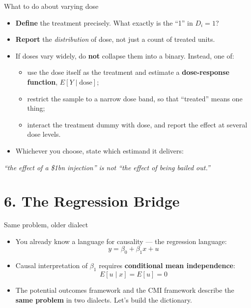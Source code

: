 \documentclass[
  11pt,
  ignorenonframetext,
  aspectratio=169,
]{beamer}
\providecommand{\tightlist}{%
  \setlength{\itemsep}{0pt}\setlength{\parskip}{0pt}}
\begin{document}
\begin{frame}{What to do about varying dose}
\protect{}\label{what-to-do-about-varying-dose}
\begin{itemize}
\tightlist
\item
  \textbf{Define} the treatment precisely. What exactly is the ``1'' in
  \(D_i = 1\)?
\item
  \textbf{Report} the \emph{distribution} of dose, not just a count of
  treated units.
\item
  If doses vary widely, do \textbf{not} collapse them into a binary.
  Instead, one of:

  \begin{itemize}
  \tightlist
  \item
    use the dose itself as the treatment and estimate a
    \textbf{dose-response function}, \(E[Y \mid \text{dose}]\);
  \item
    restrict the sample to a narrow dose band, so that ``treated'' means
    one thing;
  \item
    interact the treatment dummy with dose, and report the effect at
    several dose levels.
  \end{itemize}
\item
  Whichever you choose, state which estimand it delivers:
\end{itemize}

\begin{center}
\emph{``the effect of a \$1bn injection'' is not ``the effect of being bailed out.''}
\end{center}
\end{frame}

\section{6. The Regression Bridge}\label{the-regression-bridge}

\begin{frame}{Same problem, older dialect}
\protect{}\label{same-problem-older-dialect}
\begin{itemize}
\tightlist
\item
  You already know a language for causality --- the regression language:
  \[
  y = \beta_0 + \beta_1 x + u
  \]
\item
  Causal interpretation of \(\beta_1\) requires \textbf{conditional mean
  independence}: \[
  E[u \mid x] = E[u] = 0
  \]
\item
  The potential outcomes framework and the CMI framework describe the
  \textbf{same problem} in two dialects. Let's build the dictionary.
\end{itemize}
\end{frame}
\end{document}
